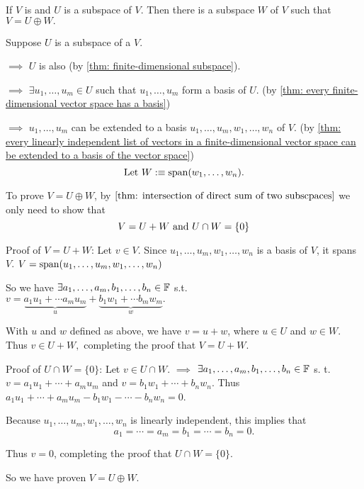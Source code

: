 \begin{thm} 
  \label{thm: every subspace of V is part of a direct sum equal to V}
  If $V$ is \fd and $U$ is a subspace of $V$. Then there is a subspace $W$ of $V$ such that $V=U \oplus W.$
\end{thm}
\begin{prf}
  Suppose $U$ is a subspace of a \fdvs $V$. 
  
  $\implies$ $U$ is also \fd (by \ref{thm: finite-dimensional subspace}). 
  
  $\implies$ $\exists u_1, \ldots, u_m \in U $ such that $u_1, \ldots, u_m $ form a basis of $U$. (by \ref{thm: every finite-dimensional vector space has a basis}) 
  
  $\implies$ $u_1, \ldots, u_m$ can be extended to a basis $u_1, \ldots, u_m, w_1, \ldots, w_n$ of $V$. (by \ref{thm: every linearly independent list of vectors in a finite-dimensional vector space can be extended to a basis of the vector space})
  \begin{equation}
    $Let $W :\equiv \myspan{w_1, \ldots, w_n}.
  \end{equation}
  
  To prove $V=U\oplus W$, by $\ref{thm: intersection of direct sum of two subscpaces}$ we only need to show that 
  \begin{equation}
    V = U+W$ and $U \cap W = \{0\}
  \end{equation}
  
  \begin{description}
    \item{Proof of $V=U+W$:} Let $v \in V$. Since $u_1, \ldots, u_m, w_1, \ldots, w_n$ is a basis of $V$, it spans $V$. $V = \operatorname{span} (u_1, \ldots, u_m, w_1, \ldots, w_n)$
    
    So we have $\exists a_1, \ldots, a_m, b_1, \ldots, b_n \in \mathbb{F}$ s.t. \\
    $v = \underbrace{a_1 u_1 + \cdots a_m u_m}_{u} + \underbrace{b_1 w_1 + \cdots b_m w_m}_{w}.$
    
    With $u$ and $w$ defined as above, we have $v=u+w$, where $u \in U$ and $w \in W$. Thus $v \in U+W,$ completing the proof that $V=U+W$.
    
    \item{Proof of $U \cap W = \{0\}$:} Let $v \in U \cap W$. $\implies$ $\exists a_1, \ldots, a_m, b_1, \ldots, b_n \in \mathbb{F}$ s. t. $v= a_1 u _1 + \cdots + a_m u_m$ and $v= b_1 w_1 + \cdots + b_n w_n$. Thus $a_1 u_1 + \cdots + a_m u_m - b_1 w_1 - \cdots - b_n w_n = 0$.
    
    Because $u_1, \ldots, u_m, w_1, \ldots, w_n$ is linearly independent, this implies that
    \begin{equation}
      a_1 = \cdots = a_m = b_1 = \cdots= b_n = 0.
    \end{equation}
    
    Thus $v=0$, completing the proof that $U\cap W = \{0\}.$
    
  \end{description}
  So we have proven $V = U \oplus W$.
\end{prf}

